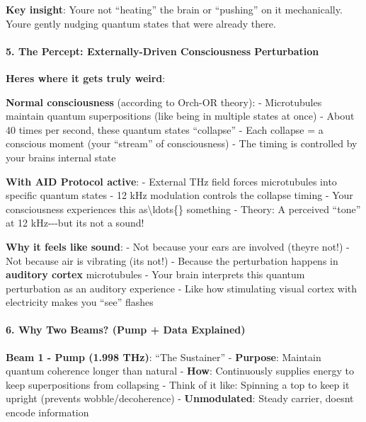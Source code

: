 \textbf{Key insight}: You\textquotesingle re not ``heating'' the brain
or ``pushing'' on it mechanically. You\textquotesingle re gently nudging
quantum states that were already there.

\paragraph{\texorpdfstring{5. \textbf{The Percept: Externally-Driven
Consciousness
Perturbation}}{5. The Percept: Externally-Driven Consciousness Perturbation}}\label{the-percept-externally-driven-consciousness-perturbation}

\textbf{Here\textquotesingle s where it gets truly weird}:

\textbf{Normal consciousness} (according to Orch-OR theory): -
Microtubules maintain quantum superpositions (like being in multiple
states at once) - About 40 times per second, these quantum states
``collapse'' - Each collapse = a conscious moment (your ``stream'' of
consciousness) - The timing is controlled by your
brain\textquotesingle s internal state

\textbf{With AID Protocol active}: - External THz field forces
microtubules into specific quantum states - 12 kHz modulation controls
the collapse timing - Your consciousness experiences this
as\textbackslash ldots\{\} something - Theory: A perceived ``tone'' at
12 kHz-\/-\/-but it\textquotesingle s not a sound!

\textbf{Why it feels like sound}: - Not because your ears are involved
(they\textquotesingle re not!) - Not because air is vibrating
(it\textquotesingle s not!) - Because the perturbation happens in
\textbf{auditory cortex} microtubules - Your brain interprets this
quantum perturbation as an auditory experience - Like how stimulating
visual cortex with electricity makes you ``see'' flashes

\paragraph{\texorpdfstring{6. \textbf{Why Two Beams? (Pump + Data
Explained)}}{6. Why Two Beams? (Pump + Data Explained)}}\label{why-two-beams-pump-data-explained}

\textbf{Beam 1 - Pump (1.998 THz)}: ``The Sustainer'' -
\textbf{Purpose}: Maintain quantum coherence longer than natural -
\textbf{How}: Continuously supplies energy to keep superpositions from
collapsing - Think of it like: Spinning a top to keep it upright
(prevents wobble/decoherence) - \textbf{Unmodulated}: Steady carrier,
doesn\textquotesingle t encode information

